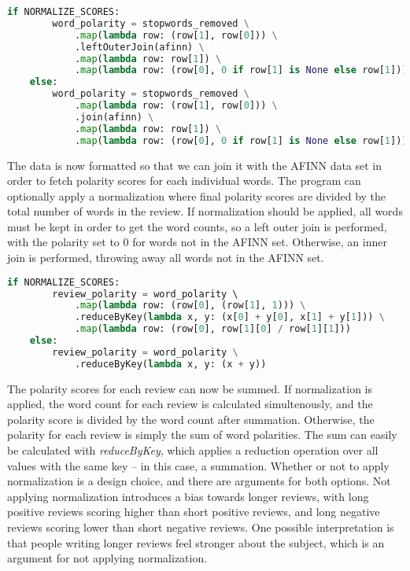 \documentclass[a4paper]{article}
\begin{document}
\begin{lstlisting}[language=python]
    if NORMALIZE_SCORES:
        word_polarity = stopwords_removed \
            .map(lambda row: (row[1], row[0])) \
            .leftOuterJoin(afinn) \
            .map(lambda row: row[1]) \
            .map(lambda row: (row[0], 0 if row[1] is None else row[1]))
    else:
        word_polarity = stopwords_removed \
            .map(lambda row: (row[1], row[0])) \
            .join(afinn) \
            .map(lambda row: row[1]) \
            .map(lambda row: (row[0], 0 if row[1] is None else row[1]))
\end{lstlisting}

The data is now formatted so that we can join it with the AFINN data set in order to fetch polarity scores for each individual words. The program can optionally apply a normalization where final polarity scores are divided by the total number of words in the review. If normalization should be applied, all words must be kept in order to get the word counts, so a left outer join is performed, with the polarity set to 0 for words not in the AFINN set. Otherwise, an inner join is performed, throwing away all words not in the AFINN set.


\begin{lstlisting}[language=python]
    if NORMALIZE_SCORES:
        review_polarity = word_polarity \ 
            .map(lambda row: (row[0], (row[1], 1))) \
            .reduceByKey(lambda x, y: (x[0] + y[0], x[1] + y[1])) \
            .map(lambda row: (row[0], row[1][0] / row[1][1]))
    else:
        review_polarity = word_polarity \
            .reduceByKey(lambda x, y: (x + y))
\end{lstlisting}

The polarity scores for each review can now be summed. If normalization is applied, the word count for each review is calculated simultenously, and the polarity score is divided by the word count after summation. Otherwise, the polarity for each review is simply the sum of word polarities. The sum can easily be calculated with \emph{reduceByKey}, which applies a reduction operation over all values with the same key -- in this case, a summation. Whether or not to apply normalization is a design choice, and there are arguments for both options. Not applying normalization introduces a bias towards longer reviews, with long positive reviews scoring higher than short positive reviews, and long negative reviews scoring lower than short negative reviews. One possible interpretation is that people writing longer reviews feel stronger about the subject, which is an argument for not applying normalization.
\end{document}

